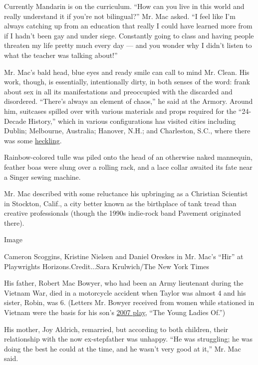 Currently Mandarin is on the curriculum. ``How can you live in this
world and really understand it if you're not bilingual?'' Mr. Mac asked.
``I feel like I'm always catching up from an education that really I
could have learned more from if I hadn't been gay and under siege.
Constantly going to class and having people threaten my life pretty much
every day --- and you wonder why I didn't listen to what the teacher was
talking about!''

Mr. Mac's bald head, blue eyes and ready smile can call to mind Mr.
Clean. His work, though, is essentially, intentionally dirty, in both
senses of the word: frank about sex in all its manifestations and
preoccupied with the discarded and disordered. ``There's always an
element of chaos,'' he said at the Armory. Around him, suitcases spilled
over with various materials and props required for the ``24-Decade
History,'' which in various configurations has visited cities including
Dublin; Melbourne, Australia; Hanover, N.H.; and Charleston, S.C., where
there was some
\href{http://www.charlestoncitypaper.com/charleston/preaching-to-the-choir-a-flamboyant-and-gifted-artist-manages-to-be-boring/Content?oid=5220392}{heckling}.

Rainbow-colored tulle was piled onto the head of an otherwise naked
mannequin, feather boas were slung over a rolling rack, and a lace
collar awaited its fate near a Singer sewing machine.

Mr. Mac described with some reluctance his upbringing as a Christian
Scientist in Stockton, Calif., a city better known as the birthplace of
tank tread than creative professionals (though the 1990s indie-rock band
Pavement originated there).

Image

Cameron Scoggins, Kristine Nielsen and Daniel Oreskes in Mr. Mac's
``Hir'' at Playwrights Horizons.Credit...Sara Krulwich/The New York
Times

His father, Robert Mac Bowyer, who had been an Army lieutenant during
the Vietnam War, died in a motorcycle accident when Taylor was almost 4
and his sister, Robin, was 6. (Letters Mr. Bowyer received from women
while stationed in Vietnam were the basis for his son's
\href{http://www.nytimes3xbfgragh.onion/2007/09/29/theater/reviews/29ladi.html}{2007
play}, ``The Young Ladies Of.'')

His mother, Joy Aldrich, remarried, but according to both children,
their relationship with the now ex-stepfather was unhappy. ``He was
struggling; he was doing the best he could at the time, and he wasn't
very good at it,'' Mr. Mac said.

